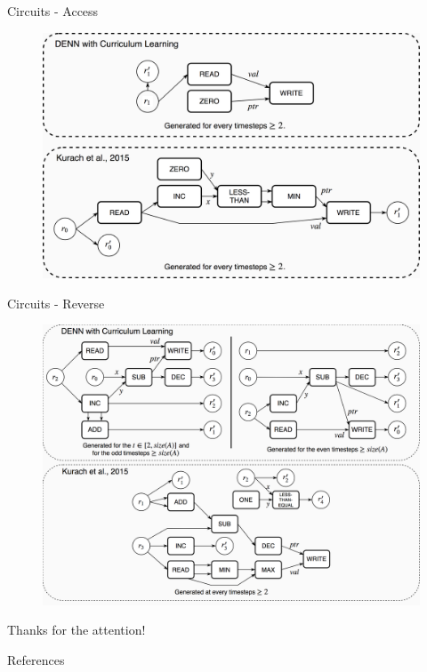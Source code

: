 \documentclass[xcolor={usenames}]{beamer}
\begin{document}
  \begin{frame}{Circuits - Access}
  	\begin{figure}
  		\includegraphics[width=\textwidth]{../figures/access-circuits.png}
  	\end{figure}
  \end{frame}
  \begin{frame}{Circuits - Reverse}
  	\begin{figure}
  		\includegraphics[width=\textwidth]{../figures/reverse-circuits.png}
  	\end{figure}
  \end{frame}
  \begin{frame}[standout]
  	Thanks for the attention!
  \end{frame}
  \begin{frame}{References}
        
  \end{frame}
\end{document}
